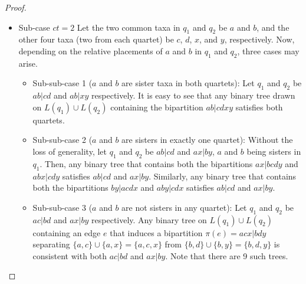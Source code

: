 \documentclass[runningheads]{llncs}
\newcommand{\addb}[1]{{\color{red} #1}}
\begin{document}
\begin{appendices}
\begin{proof}
\begin{itemize}
\begin{itemize}
    \item Sub-case $ct = 2$ Let the two common taxa in $q_1$ and $q_2$ be $a$ and $b$, and the other four taxa (two from each quartet) be $c$, $d$, $x$, and $y$, respectively. Now, depending on the relative placements of $a$ and $b$ in $q_1$ and $q_2$, three cases may arise.
\begin{itemize}
    \item Sub-sub-case 1 ($a$ and $b$ are sister taxa in both quartets): Let $q_1$ and $q_2$ be $ab|cd$ and $ab|xy$ respectively. It is easy to see that any binary tree drawn on $L(q_1) \cup L(q_2)$ containing the bipartition $ab|cdxy$ satisfies both quartets.
    \item Sub-sub-case 2 ($a$ and $b$ are sisters in exactly one quartet): Without the loss of generality, let $q_1$ and $q_2$ be $ab|cd$ and $ax|by$, $a$ and $b$ being sisters in $q_1$. Then, any binary tree that contains both the bipartitions $ax|bcdy$ and $abx|cdy$ satisfies $ab|cd$ and $ax|by$. Similarly, any binary tree that contains both the bipartitions $by|acdx$ and $aby|cdx$ satisfies $ab|cd$ and $ax|by$. 
    
    
    \item Sub-sub-case 3 ($a$ and $b$ are not sisters in any quartet): Let $q_1$ and $q_2$ be $ac|bd$ and $ax|by$ respectively. Any binary tree on $L(q_1) \cup L(q_2)$ containing an edge $e$ that induces a bipartition $\pi(e) = acx|bdy$ separating $\{a,c\} \cup \{a,x\} = \{a,c,x\}$ from $\{b,d\} \cup \{b,y\} = \{b,d,y\}$ is consistent with both $ac|bd$ and $ax|by$. Note that there are 9 such trees. 
    

    
    

\end{itemize}
\end{itemize}
\end{itemize}
\end{proof}
\end{appendices}
\end{document}
